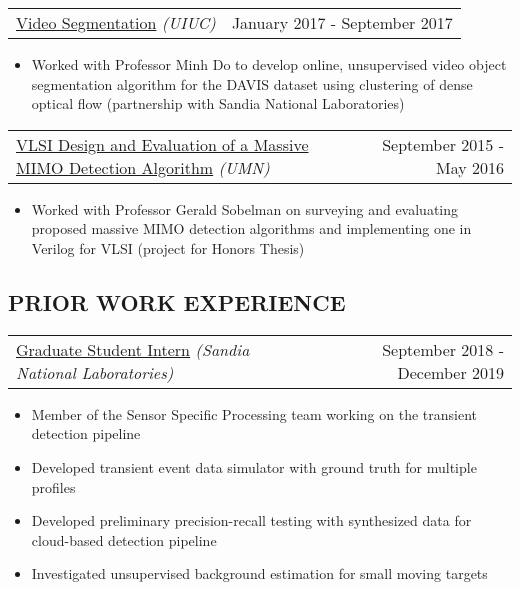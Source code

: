 \documentclass[10pt, letterpaper]{article}
\makeatletter
\newcommand{\headerrow}[2]
{\begin{tabular*}{\linewidth}{l@{\extracolsep{\fill}}r}
	#1 &
	#2 \\
\end{tabular*}}
\newcommand{\sansserif}{\cabin}
\makeatother
\begin{document}
\headerrow
	{\uline{Video Segmentation} \textit{(UIUC)}}
	{January 2017 - September 2017}
	\begin{itemize}
		\item
		Worked with Professor Minh Do to develop online, unsupervised video object segmentation algorithm for the DAVIS dataset using clustering of dense optical flow (partnership with Sandia National Laboratories)	
	\end{itemize}

\headerrow
	{\uline{VLSI Design and Evaluation of a Massive MIMO Detection Algorithm} \textit{(UMN)}}
	{September 2015 - May 2016}
	\begin{itemize}
		\item
		Worked with Professor Gerald Sobelman on surveying and evaluating proposed massive MIMO detection algorithms and implementing one in Verilog for VLSI (project for Honors Thesis) 
	\end{itemize}


\subsection*{\sansserif PRIOR WORK EXPERIENCE}

\headerrow
	{\uline{Graduate Student Intern} \textit{(Sandia National Laboratories)}}
	{September 2018 - December 2019}
		\begin{itemize}
			\item Member of the Sensor Specific Processing team
				working on the transient detection pipeline
			\item Developed transient event data simulator with
				ground truth for multiple profiles
			\item Developed preliminary precision-recall
				testing with synthesized data for cloud-based
				detection pipeline
			\item Investigated unsupervised background estimation
				for small moving targets
		\end{itemize}
\end{document}
